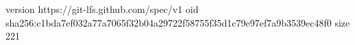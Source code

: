 version https://git-lfs.github.com/spec/v1
oid sha256:c1bda7ef032a77a7065f32b04a29722f58755f35d1c79e97ef7a9b3539ec48f0
size 221
